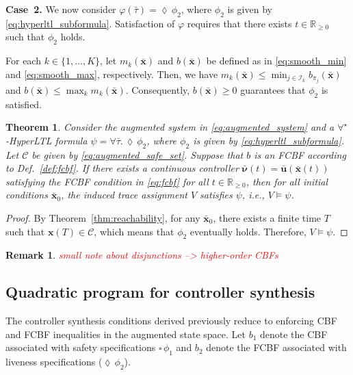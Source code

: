 \documentclass[letterpaper, 10 pt, conference]{ieeeconf}  %
\newtheorem{remark}{Remark}
\newtheorem{theorem}{Theorem}
\begin{document}
\textbf{Case~2.} We now consider $\varphi(\bar{\tau}) = \lozenge \, \phi_2$, where $\phi_2$ is given by \eqref{eq:hyperltl_subformula}. Satisfaction of $\varphi$ requires that there exists $t \in \mathbb{R}_{\ge 0}$ such that $\phi_2$ holds. 

For each $k \in \{1, \dots, K\}$, let $m_k(\bar{\mathbf{x}})$ and $b(\bar{\mathbf{x}})$ be defined as in \eqref{eq:smooth_min} and \eqref{eq:smooth_max}, respectively. Then, we have $m_k(\bar{\mathbf{x}}) \le \min_{j \in \mathcal{I}_k} b_{\pi_j}(\bar{\mathbf{x}})$ and $b(\bar{\mathbf{x}}) \le \max_k m_k(\bar{\mathbf{x}})$. Consequently, $b(\bar{\mathbf{x}}) \ge 0$ guarantees that $\phi_2$ is satisfied.
\begin{theorem} \label{thm:reachability_hyper}
    Consider the augmented system in \eqref{eq:augmented_system} and a $\forall^\star$-HyperLTL formula $\psi = \forall \bar{\tau} . \, \lozenge \, \phi_2$, where $\phi_2$ is given by \eqref{eq:hyperltl_subformula}. Let $\mathcal{C}$ be given by \eqref{eq:augmented_safe_set}. Suppose that $b$ is an FCBF according to Def.~\ref{def:fcbf}. If there exists a continuous controller $\bar{\boldsymbol{\nu}}(t) = \bar{\mathbf{u}}(\bar{\mathbf{x}}(t))$ satisfying the FCBF condition in \eqref{eq:fcbf} for all $t \in \mathbb{R}_{\ge 0}$, then for all initial conditions $\bar{\mathbf{x}}_0$, the induced trace assignment $V$ satisfies $\psi$, i.e., $V \models \psi$.
\end{theorem}
\begin{proof}
    By Theorem~\ref{thm:reachability}, for any $\bar{\mathbf{x}}_0$, there exists a finite time $T$ such that $\mathbf{x}(T) \in \mathcal{C}$, which means  that $\phi_2$ eventually holds. Therefore, $V \models \psi$.
\end{proof}

\begin{remark}
    \textcolor{red}{small note about disjunctions --> higher-order CBFs}
\end{remark}

\subsection{Quadratic program for controller synthesis} \label{subsec:qp}

The controller synthesis conditions derived previously reduce to enforcing CBF and FCBF inequalities in the augmented state space. Let $b_1$ denote the CBF associated with safety specifications $\square \, \phi_1$ and $b_2$ denote the FCBF associated with liveness specifications ($\lozenge \, \phi_2$).
\end{document}
